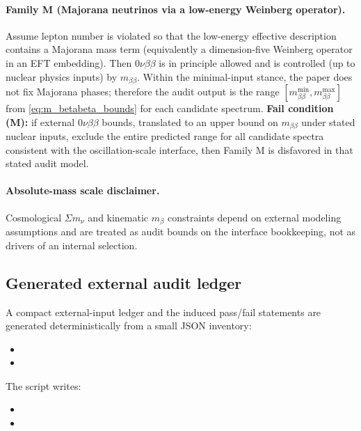 \paragraph{Family M (Majorana neutrinos via a low-energy Weinberg operator).}
Assume lepton number is violated so that the low-energy effective description contains
a Majorana mass term (equivalently a dimension-five Weinberg operator in an EFT embedding).
Then 0$\nu\beta\beta$ is in principle allowed and is controlled (up to nuclear physics inputs) by $m_{\beta\beta}$.
Within the minimal-input stance, the paper does not fix Majorana phases; therefore the audit output is the range
\([m_{\beta\beta}^{\min},m_{\beta\beta}^{\max}]\) from \eqref{eq:m_betabeta_bounds} for each candidate spectrum.
\textbf{Fail condition (M):}
if external 0$\nu\beta\beta$ bounds, translated to an upper bound on $m_{\beta\beta}$ under stated nuclear inputs,
exclude the entire predicted range for all candidate spectra consistent with the oscillation-scale interface,
then Family M is disfavored in that stated audit model.

\paragraph{Absolute-mass scale disclaimer.}
\MatchTag Cosmological $\Sigma m_\nu$ and kinematic $m_\beta$ constraints depend on external modeling assumptions
and are treated as audit bounds on the interface bookkeeping, not as drivers of an internal selection.

\subsection{Generated external audit ledger}
\label{subsec:neutrino_external_audit_ledger}

\AuditTag A compact external-input ledger and the induced pass/fail statements are generated deterministically from a small JSON inventory:
\begin{itemize}
\item {}
\item {}
\end{itemize}
The script writes:
\begin{itemize}
\item {}
\item {}
\end{itemize}

